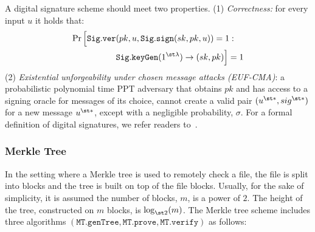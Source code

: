 A digital signature scheme should meet two properties. (1) \textit{Correctness:} for every input $u$ it holds that:
%
\begin{equation*}
\begin{split}
\Pr\Big[  \mathtt{Sig.ver}&( pk, u, \mathtt{Sig.sign}(sk, pk, u))=1:\\
&\mathtt{Sig.keyGen}(1^{\st \lambda})\rightarrow (sk, pk)  \Big]=1
\end{split}
\end{equation*}
%
(2) \textit{Existential unforgeability under chosen message attacks (EUF-CMA)}: a probabilistic polynomial time PPT adversary that obtains $pk$ and has access to a signing oracle for messages of its choice, cannot create a valid pair $(u^{\st *},sig^{\st *})$ for a new message $u^{\st *}$, except with a negligible probability, $\sigma$. For a formal definition of digital signatures, we refer readers to~\cite{DBLP:books/crc/KatzLindell2014}. 
 
 
 
\subsubsection{Merkle Tree}\label{sec::merkle-tree}


In the setting where  a Merkle tree is used to remotely check a file, the file  is  split into blocks and the tree is built on top of the file blocks. Usually, for the sake of simplicity, it is assumed the number of blocks, $m$, is a power of $2$. The height of the tree, constructed on $m$ blocks, is $\log_{\st 2}(m)$. The 
Merkle tree scheme includes three algorithms $(\mathtt{MT.genTree}, \mathtt{MT.prove}, \mathtt{MT.verify})$ as follows: 




